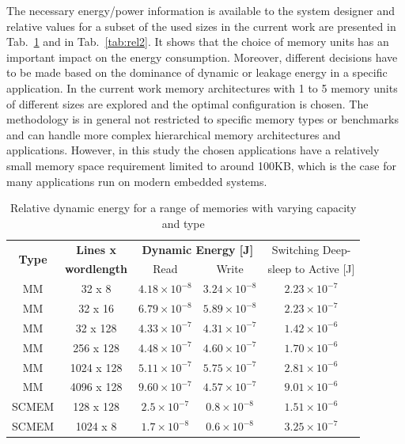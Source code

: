 \documentclass[smallextended]{svjour3}
\begin{document}
The necessary energy/power information is available to the system designer and relative values for a subset of the used sizes in the current work are presented in Tab.~\ref{tab:rel1} and in Tab.~\ref{tab:rel2}. 
It shows that the choice of memory units has an important impact on the energy consumption. 
Moreover, different decisions have to be made based on the dominance of dynamic or leakage energy in a specific application. 
In the current work memory architectures with 1 to 5 memory units  of different sizes are explored and the optimal configuration is chosen. 
The methodology is in general not restricted to specific memory types or benchmarks and can handle more complex hierarchical memory architectures and applications. 
However, in this study the chosen applications have a relatively small memory space requirement limited to around 100KB, which is the case for many applications run on modern embedded systems. 

\begin{table}
	\caption{Relative dynamic energy for a range of memories with varying capacity and type}
	\label{tab:rel1}
	\begin{tabular}{|c|c|c|c|c|}
		\hline
		\multirow{2}{*}{\textbf{Type}} & \textbf{Lines x} & \multicolumn{2}{c|}{\textbf{Dynamic Energy [J]}} & {Switching Deep-} \\ \cline{3-4}
		& \textbf{wordlength} & Read & Write  &sleep to Active [J]\\ 
		\hline 
		MM & 32 x 8 &  $ 4.18 \times 10^{-8} $ &  $ 3.24 \times 10^{-8} $ & $ 2.23 \times 10^{-7} $ \\ 
		\hline
		MM & 32 x 16 & $  6.79 \times 10^{-8} $ &  $ 5.89 \times 10^{-8} $ & $ 2.23 \times 10^{-7} $ \\ 
		\hline
		MM & 32 x 128 & $  4.33 \times 10^{-7} $ &  $ 4.31 \times 10^{-7} $ & $ 1.42 \times 10^{-6} $ \\ 
		\hline
		MM & 256 x 128 & $  4.48 \times 10^{-7} $ &  $ 4.60 \times 10^{-7} $ & $ 1.70 \times 10^{-6} $ \\ 
		\hline
		MM & 1024 x 128 & $  5.11 \times 10^{-7} $ &  $ 5.75 \times 10^{-7} $ & $ 2.81 \times 10^{-6} $ \\ 
		\hline
		MM & 4096 x 128 & $  9.60 \times 10^{-7} $ &  $ 4.57 \times 10^{-7} $ & $ 9.01 \times 10^{-6} $ \\ 
		\hline
		SCMEM & 128 x 128 & $  2.5 \times 10^{-7} $ &  $ 0.8 \times 10^{-8} $ & $ 1.51 \times 10^{-6} $ \\ 
		\hline
		SCMEM & 1024 x 8 & $  1.7 \times 10^{-8} $ &  $ 0.6 \times 10^{-8} $ & $ 3.25 \times 10^{-7} $ \\ 
		\hline
	\end{tabular}
\end{table}
\end{document}
